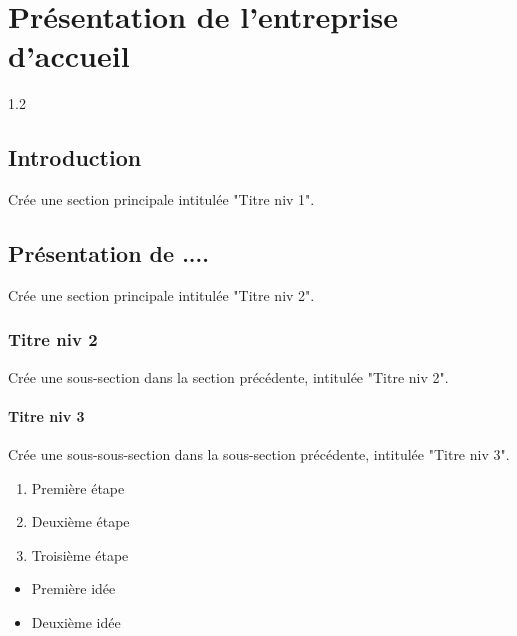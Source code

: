 \chapter{Présentation de l'entreprise d’accueil} %
\begin{spacing}{1.2} %
	\renewcommand{\mtctitle}{Contenu} %
	\minitoc %
	\thispagestyle{MyStyle} %
\end{spacing} %
\newpage %


\section{Introduction}
Crée une section principale intitulée "Titre niv 1".

\section{Présentation de ....}
Crée une section principale intitulée "Titre niv 2".

\subsection{Titre niv 2}
Crée une sous-section dans la section précédente, intitulée "Titre niv 2".

\subsubsection{Titre niv 3}
Crée une sous-sous-section dans la sous-section précédente, intitulée "Titre niv 3".
\begin{enumerate}
	\item Première étape
	\item Deuxième étape
	\item Troisième étape
\end{enumerate}


\begin{itemize}
	\item Première idée
	\item Deuxième idée
\end{itemize}

